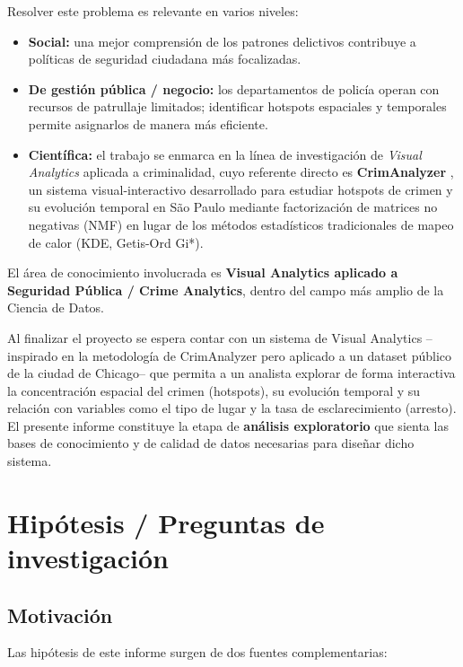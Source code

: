 \documentclass[11pt,a4paper]{article}
\begin{document}
Resolver este problema es relevante en varios niveles:

\begin{itemize}
    \item \textbf{Social:} una mejor comprensión de los patrones delictivos
    contribuye a políticas de seguridad ciudadana más focalizadas.
    \item \textbf{De gestión pública / negocio:} los departamentos de policía
    operan con recursos de patrullaje limitados; identificar hotspots
    espaciales y temporales permite asignarlos de manera más eficiente.
    \item \textbf{Científica:} el trabajo se enmarca en la línea de
    investigación de \textit{Visual Analytics} aplicada a criminalidad, cuyo
    referente directo es \textbf{CrimAnalyzer} \cite{crimanalyzer}, un sistema
    visual-interactivo desarrollado para estudiar hotspots de crimen y su
    evolución temporal en São Paulo mediante factorización de matrices no
    negativas (NMF) en lugar de los métodos estadísticos tradicionales de
    mapeo de calor (KDE, Getis-Ord Gi*).
\end{itemize}

El área de conocimiento involucrada es \textbf{Visual Analytics aplicado a
Seguridad Pública / Crime Analytics}, dentro del campo más amplio de la
Ciencia de Datos.

Al finalizar el proyecto se espera contar con un sistema de Visual Analytics
--inspirado en la metodología de CrimAnalyzer pero aplicado a un dataset
público de la ciudad de Chicago-- que permita a un analista explorar de
forma interactiva la concentración espacial del crimen (hotspots), su
evolución temporal y su relación con variables como el tipo de lugar y la
tasa de esclarecimiento (arresto). El presente informe constituye la etapa
de \textbf{análisis exploratorio} que sienta las bases de conocimiento y de
calidad de datos necesarias para diseñar dicho sistema.

\section{Hipótesis / Preguntas de investigación}

\subsection{Motivación}

Las hipótesis de este informe surgen de dos fuentes complementarias:
\end{document}
